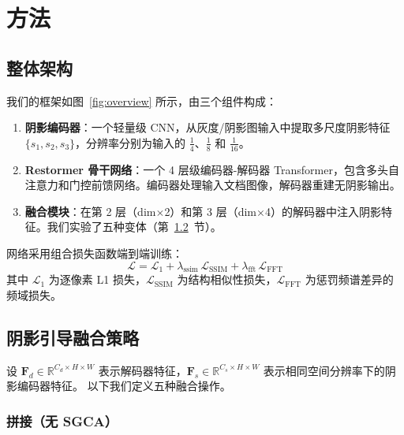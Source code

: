 \documentclass[11pt]{ctexart}
\begin{document}
\section{方法}

\subsection{整体架构}
\label{sec:arch}

我们的框架如图~\ref{fig:overview} 所示，由三个组件构成：

\begin{enumerate}
  \item \textbf{阴影编码器}：一个轻量级 CNN，从灰度/阴影图输入中提取多尺度阴影特征 $\{s_1, s_2, s_3\}$，分辨率分别为输入的 $\frac{1}{4}$、$\frac{1}{8}$ 和 $\frac{1}{16}$。
  \item \textbf{Restormer 骨干网络}：一个 4 层级编码器-解码器 Transformer，包含多头自注意力和门控前馈网络。编码器处理输入文档图像，解码器重建无阴影输出。
  \item \textbf{融合模块}：在第 2 层（dim$\times$2）和第 3 层（dim$\times$4）的解码器中注入阴影特征。我们实验了五种变体（第~\ref{sec:fusion}~节）。
\end{enumerate}

网络采用组合损失函数端到端训练：
\begin{equation}
  \mathcal{L} = \mathcal{L}_1 + \lambda_{\text{ssim}}\,\mathcal{L}_{\text{SSIM}} + \lambda_{\text{fft}}\,\mathcal{L}_{\text{FFT}}
\end{equation}
其中 $\mathcal{L}_1$ 为逐像素 L1 损失，$\mathcal{L}_{\text{SSIM}}$ 为结构相似性损失，$\mathcal{L}_{\text{FFT}}$ 为惩罚频谱差异的频域损失。

\subsection{阴影引导融合策略}
\label{sec:fusion}

设 $\mathbf{F}_d \in \mathbb{R}^{C_d \times H \times W}$ 表示解码器特征，$\mathbf{F}_s \in \mathbb{R}^{C_s \times H \times W}$ 表示相同空间分辨率下的阴影编码器特征。
以下我们定义五种融合操作。

\subsubsection{拼接（无 SGCA）}
\end{document}
